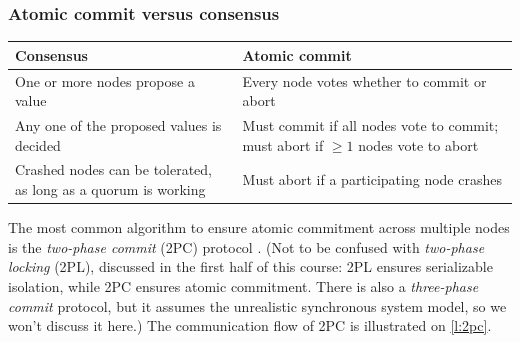 \begin{frame}
    \label{s:atomic-commit-consensus}
    \frametitle{Atomic commit versus consensus}
    \renewcommand{\arraystretch}{1.5}
    \begin{tabular}{>{\raggedright}p{5cm}|>{\raggedright\arraybackslash}p{5cm}} %
        \textbf{Consensus} & \textbf{Atomic commit} \\\hline
        One or more nodes propose a value & Every node votes whether to commit or abort \pause\\
        Any one of the proposed values is decided & Must commit if all nodes vote to commit; must abort if $\ge 1$ nodes vote to abort \pause\\
        Crashed nodes can be tolerated, as long as a quorum is working & Must abort if a participating node crashes
    \end{tabular}
\end{frame}
\label{l:atomic-commit-consensus}

The most common algorithm to ensure atomic commitment across multiple nodes is the \emph{two-phase commit} (2PC) protocol \citep{Gray:1978}.
(Not to be confused with \emph{two-phase locking} (2PL), discussed in the first half of this course: 2PL ensures serializable isolation, while 2PC ensures atomic commitment.
There is also a \emph{three-phase commit} protocol, but it assumes the unrealistic synchronous system model, so we won't discuss it here.)
The communication flow of 2PC is illustrated on \autoref{l:2pc}.

